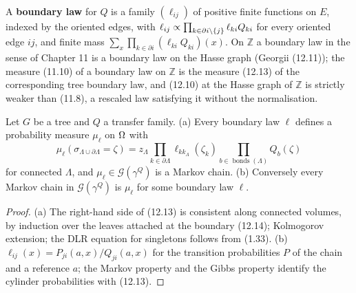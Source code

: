\begin{definition}
    \label{def:tr-boundary-law}
    \leanok

    A \textbf{boundary law} for $Q$ is a family $(\ell_{ij})$ of positive finite functions on $E$,
    indexed by the oriented edges, with
    $\ell_{ij} \propto \prod_{k \in \partial i \setminus \left\{ j \right\}} \ell_{ki} Q_{ki}$ for every
    oriented edge $ij$, and finite mass $\sum_x \prod_{k \in \partial i}(\ell_{ki}Q_{ki})(x)$.
    On $\mathbb Z$ a boundary law in the sense of Chapter 11 is a boundary law on the Hasse graph
    (Georgii (12.11)); the measure (11.10) of a boundary law on $\mathbb Z$ is the measure (12.13)
    of the corresponding tree boundary law, and (12.10) at the Hasse graph of $\mathbb Z$ is strictly
    weaker than (11.8), a rescaled law satisfying it without the normalisation.
\end{definition}

\begin{theorem}[Georgii (12.12)]
    \label{thm:tr-12-12}
    \leanok

    Let $G$ be a tree and $Q$ a transfer family. (a) Every boundary law $\ell$ defines a
    probability measure $\mu_\ell$ on $\Omega$ with
    \[
        \mu_\ell(\sigma_{\Lambda \cup \partial\Lambda} = \zeta)
        = z_\Lambda \prod_{k \in \partial\Lambda} \ell_{k k_\Lambda}(\zeta_k)
          \prod_{b \in \operatorname{bonds}(\Lambda)} Q_b(\zeta) \tag{12.13}
    \]
    for connected $\Lambda$, and $\mu_\ell \in \mathcal G(\gamma^Q)$ is a Markov chain. (b)
    Conversely every Markov chain in $\mathcal G(\gamma^Q)$ is $\mu_\ell$ for some boundary law
    $\ell$.
\end{theorem}
\begin{proof}
    \leanok
    (a) The right-hand side of (12.13) is consistent along connected volumes, by induction over
    the leaves attached at the boundary (12.14); Kolmogorov extension; the DLR equation for
    singletons follows from (1.33). (b) $\ell_{ij}(x) = P_{ji}(a,x)/Q_{ji}(a,x)$ for the
    transition probabilities $P$ of the chain and a reference $a$; the Markov property and the
    Gibbs property identify the cylinder probabilities with (12.13).
\end{proof}

